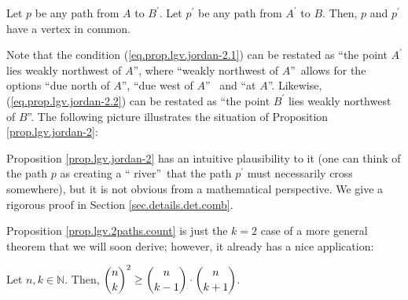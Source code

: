 \begin{definition}
\begin{proposition}
Let $p$ be any path from $A$ to $B^{\prime}$. Let $p^{\prime}$ be any path
from $A^{\prime}$ to $B$. Then, $p$ and $p^{\prime}$ have a vertex in common.
\end{proposition}

Note that the condition (\ref{eq.prop.lgv.jordan-2.1}) can be restated as
\textquotedblleft the point $A^{\prime}$ lies weakly northwest of
$A$\textquotedblright, where \textquotedblleft weakly northwest of
$A$\textquotedblright\ allows for the options \textquotedblleft due north of
$A$\textquotedblright, \textquotedblleft due west of $A$\textquotedblright%
\ and \textquotedblleft at $A$\textquotedblright. Likewise,
(\ref{eq.prop.lgv.jordan-2.2}) can be restated as \textquotedblleft the point
$B^{\prime}$ lies weakly northwest of $B$\textquotedblright. The following
picture illustrates the situation of Proposition \ref{prop.lgv.jordan-2}:%
\[%
\]


Proposition \ref{prop.lgv.jordan-2} has an intuitive plausibility to it (one
can think of the path $p$ as creating a \textquotedblleft
river\textquotedblright\ that the path $p^{\prime}$ must necessarily cross
somewhere), but it is not obvious from a mathematical perspective. We give a
rigorous proof in Section \ref{sec.details.det.comb}.

Proposition \ref{prop.lgv.2paths.count} is just the $k=2$ case of a more
general theorem that we will soon derive; however, it already has a nice application:

\begin{corollary}
\label{cor.lgv.binom-unimod}Let $n,k\in\mathbb{N}$. Then, $\dbinom{n}{k}%
^{2}\geq\dbinom{n}{k-1}\cdot\dbinom{n}{k+1}$.
\end{corollary}


\end{definition}
